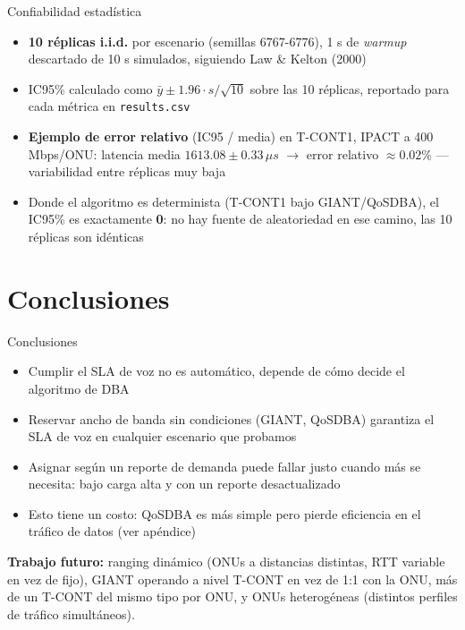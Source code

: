 \documentclass[aspectratio=169,t]{beamer}
\begin{document}
\begin{frame}{Confiabilidad estadística}
    \footnotesize
    \begin{itemize}
        \item \textbf{10 réplicas i.i.d.} por escenario (semillas
              6767-6776), 1 s de \textit{warmup} descartado de 10 s
              simulados, siguiendo Law \& Kelton (2000)
        \item IC95\% calculado como $\bar{y} \pm 1.96 \cdot s/\sqrt{10}$
              sobre las 10 réplicas, reportado para cada métrica en
              \texttt{results.csv}
        \item \textbf{Ejemplo de error relativo} (IC95 / media)
              en T-CONT1, IPACT a 400 Mbps/ONU: latencia media
              $1613.08 \pm 0.33\,\mu s$ $\rightarrow$ error relativo
              $\approx 0.02\%$ — variabilidad entre réplicas muy baja
        \item Donde el algoritmo es determinista (T-CONT1 bajo
              GIANT/QoSDBA), el IC95\% es exactamente \textbf{0}: no hay
              fuente de aleatoriedad en ese camino, las 10 réplicas son
              idénticas
    \end{itemize}
\end{frame}

\section{Conclusiones}

\begin{frame}{Conclusiones}
    \begin{itemize}
        \item Cumplir el SLA de voz no es automático, depende de cómo
              decide el algoritmo de DBA
        \item Reservar ancho de banda sin condiciones (GIANT, QoSDBA)
              garantiza el SLA de voz en cualquier escenario que probamos
        \item Asignar según un reporte de demanda puede fallar justo
              cuando más se necesita: bajo carga alta y con un reporte
              desactualizado
        \item Esto tiene un costo: QoSDBA es más simple pero pierde
              eficiencia en el tráfico de datos (ver apéndice)
    \end{itemize}

    \vspace{0.2cm}
    \footnotesize
    \textbf{Trabajo futuro:} ranging dinámico (ONUs a distancias
    distintas, RTT variable en vez de fijo), GIANT operando a nivel
    T-CONT en vez de 1:1 con la ONU, más de un T-CONT del mismo tipo por
    ONU, y ONUs heterogéneas (distintos perfiles de tráfico simultáneos).
\end{frame}
\end{document}
